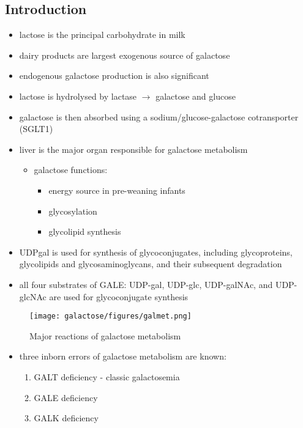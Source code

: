 \documentclass{scrartcl}
\begin{document}
\subsection{Introduction}
\label{sec:org469cd6e}
\begin{itemize}
\item lactose is the principal carbohydrate in milk
\item dairy products are largest exogenous source of galactose
\item endogenous galactose production is also significant
\item lactose is hydrolysed by lactase \(\to\) galactose and glucose
\item galactose is then absorbed using a sodium/glucose-galactose cotransporter (SGLT1)
\item liver is the major organ responsible for galactose metabolism
\begin{itemize}
\item galactose functions:
\begin{itemize}
\item energy source in pre-weaning infants
\item glycosylation
\item glycolipid synthesis
\end{itemize}
\end{itemize}

\item UDPgal is used for synthesis of glycoconjugates, including
glycoproteins, glycolipids and glycosaminoglycans, and their
subsequent degradation
\item all four substrates of GALE: UDP-gal, UDP-glc, UDP-galNAc, and
UDP-glcNAc are used for glycoconjugate synthesis
\end{itemize}

\begin{figure}[htbp]
\centering
\texttt{[image: galactose/figures/galmet.png]}
\caption{\label{fig:org5ee123e}Major reactions of galactose metabolism}
\end{figure}

\begin{itemize}
\item three inborn errors of galactose metabolism are known:
\begin{enumerate}
\item GALT deficiency - classic galactosemia
\item GALE deficiency
\item GALK deficiency
\end{enumerate}
\end{itemize}
\end{document}
